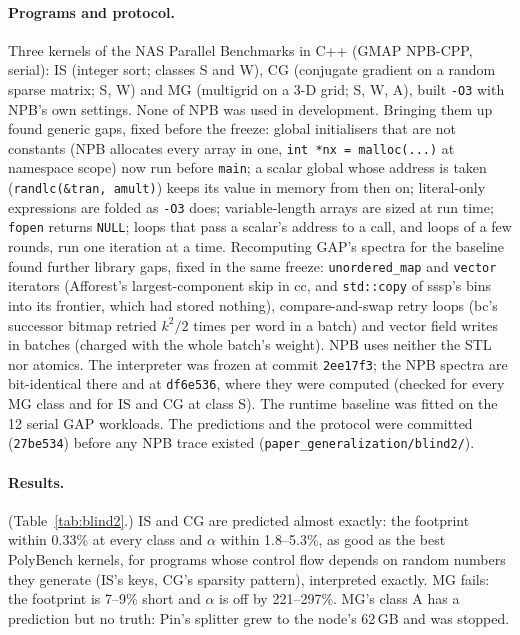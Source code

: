 \documentclass[11pt]{article}
\newcommand{\code}[1]{\texttt{#1}}
\newcommand{\tabref}[1]{Table~\ref{#1}}
\begin{document}
\paragraph{Programs and protocol.} Three kernels of the NAS Parallel Benchmarks in C++ (GMAP NPB-CPP, serial):
IS (integer sort; classes S and W), CG (conjugate gradient on a random sparse matrix; S, W) and MG (multigrid on a
3-D grid; S, W, A), built \code{-O3} with NPB's own settings. None of NPB was used in development. Bringing them up
found generic gaps, fixed before the freeze: global initialisers that are not constants (NPB allocates every array in
one, \code{int *nx = malloc(...)} at namespace scope) now run before \code{main}; a scalar global whose address is
taken (\code{randlc(\&tran, amult)}) keeps its value in memory from then on; literal-only expressions are folded as
\code{-O3} does; variable-length arrays are sized at run time; \code{fopen} returns \code{NULL}; loops that pass a
scalar's address to a call, and loops of a few rounds, run one iteration at a time. Recomputing GAP's spectra for the
baseline found further library gaps, fixed in the same freeze: \code{unordered\_map} and \code{vector} iterators
(Afforest's largest-component skip in cc, and \code{std::copy} of sssp's bins into its frontier, which had stored
nothing), compare-and-swap retry loops (bc's successor bitmap retried $k^2/2$ times per word in a batch) and vector
field writes in batches (charged with the whole batch's weight). NPB uses neither the STL nor atomics. The
interpreter was frozen at commit \code{2ee17f3}; the NPB spectra are bit-identical there and at \code{df6e536}, where
they were computed (checked for every MG class and for IS and CG at class S). The runtime baseline was fitted on the
12 serial GAP workloads. The predictions and the protocol were committed (\code{27be534}) before any NPB trace
existed (\code{paper\_generalization/blind2/}).

\paragraph{Results.} (\tabref{tab:blind2}.) IS and CG are predicted almost exactly: the footprint within 0.33\% at
every class and $\alpha$ within 1.8--5.3\%, as good as the best PolyBench kernels, for programs whose control flow
depends on random numbers they generate (IS's keys, CG's sparsity pattern), interpreted exactly. MG fails: the
footprint is 7--9\% short and $\alpha$ is off by 221--297\%. MG's class A has a prediction but no truth: Pin's
splitter grew to the node's 62\,GB and was stopped.
\end{document}
